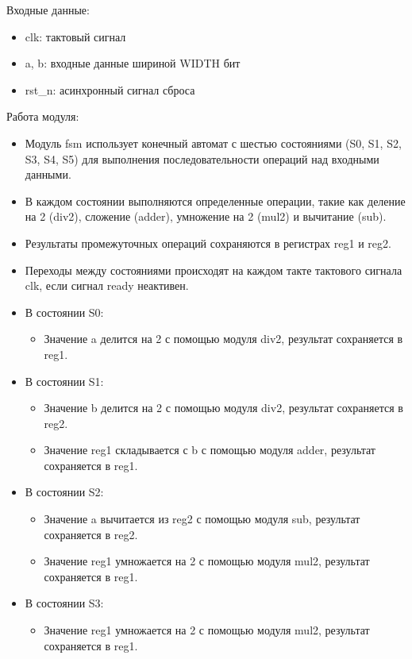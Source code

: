 \documentclass[12pt,onecolumn]{article}
\begin{document}
Входные данные:
\begin{itemize}
    \item clk: тактовый сигнал
    \item a, b: входные данные шириной WIDTH бит
    \item rst\_n: асинхронный сигнал сброса
\end{itemize}
Работа модуля:
\begin{itemize}
    \item Модуль fsm использует конечный автомат с шестью состояниями (S0, S1, S2, S3, S4, S5) для выполнения последовательности операций над входными данными.
    \item В каждом состоянии выполняются определенные операции, такие как деление на 2 (div2), сложение (adder), умножение на 2 (mul2) и вычитание (sub).
    \item Результаты промежуточных операций сохраняются в регистрах reg1 и reg2.
    \item Переходы между состояниями происходят на каждом такте тактового сигнала clk, если сигнал ready неактивен.
    \item {В состоянии S0:
    \begin{itemize}
        \item Значение a делится на 2 с помощью модуля div2, результат сохраняется в reg1.
    \end{itemize}
    }
    \item { В состоянии S1:
    \begin{itemize}
        \item Значение b делится на 2 с помощью модуля div2, результат сохраняется в reg2.
        \item Значение reg1 складывается с b с помощью модуля adder, результат сохраняется в reg1.
    \end{itemize}
    }
    \item {
        В состоянии S2:
        \begin{itemize}
            \item Значение a вычитается из reg2 с помощью модуля sub, результат сохраняется в reg2.
            \item Значение reg1 умножается на 2 с помощью модуля mul2, результат сохраняется в reg1.
        \end{itemize}
    }
    \item {
        В состоянии S3:
        \begin{itemize}
            \item Значение reg1 умножается на 2 с помощью модуля mul2, результат сохраняется в reg1.

\end{itemize}}
\end{itemize}
\end{document}
